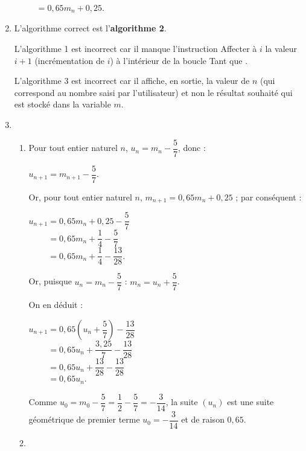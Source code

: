 \begin{corrige}
\begin{enumerate}
     $\phantom{m_{n+1}	}	 		 = 0,65m_n+0,25.$
     \par
     \item %
     L'algorithme correct est l'\textbf{algorithme 2}.
     \par
     L'algorithme 1 est incorrect car il manque l'instruction \og Affecter à $i$ la valeur $i+1$ \fg{} (incrémentation de $i$) à l'intérieur de la boucle \og Tant que \fg{}.
     \par
     L'algorithme 3 est incorrect car il affiche, en sortie, la valeur de $n$ (qui correspond au nombre saisi par l'utilisateur) et non le résultat souhaité qui est stocké dans la variable $m$.
     \item %
   
     \begin{enumerate}[label=\alph*.]
          \item %
          Pour tout entier naturel $n$, $u_{n}= m_{n}-\dfrac{5}{7}$, donc :
          \par
          $u_{n+1}= m_{n+1}-\dfrac{5}{7}$.
          \par
          Or, pour tout entier naturel $n$, $m_{n+1}=0,65m_n+0,25$ ; par conséquent :
          \par
          $u_{n+1}= 0,65m_n+0,25-\dfrac{5}{7}$\\
          $\phantom{u_{n+1}}=0,65m_n+\dfrac{1}{4}-\dfrac{5}{7}$\\
          $\phantom{u_{n+1}}=0,65m_n+\dfrac{1}{4}-\dfrac{13}{28}.$
          \par
          \par
          Or, puisque $u_{n}= m_{n}-\dfrac{5}{7}$ : $m_{n}= u_{n}+\dfrac{5}{7}$.
          \par
          On en déduit :
          \par
          $u_{n+1}= 0,65\left(u_{n}+\dfrac{5}{7}\right)-\dfrac{13}{28}$\\
          $\phantom{u_{n+1}}= 0,65u_{n}+\dfrac{3,25}{7}-\dfrac{13}{28}$\\
          $\phantom{u_{n+1}}= 0,65u_{n}+\dfrac{13}{28}-\dfrac{13}{28}$\\
          $\phantom{u_{n+1}}= 0,65u_{n}.$
          \par
          \par
          Comme $u_{0}= m_{0}-\dfrac{5}{7}=\dfrac{1}{2}-\dfrac{5}{7}=-\dfrac{3}{14}$, la suite $(u_n)$ est une suite géométrique de premier terme ${u_0=-\dfrac{3}{14}}$ et de raison $0,65$.
          \item %

\end{enumerate}
\end{enumerate}
\end{corrige}
